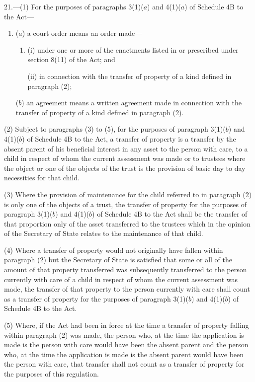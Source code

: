\documentclass[a4paper]{article}
\newcommand{\parthead}{}
\begin{document}
\renewcommand\parthead{--- Part IV}

21.—(1) For the purposes of paragraphs 3(1)($a$) and 4(1)($a$) of Schedule 4B to the Act—
\begin{enumerate}\item[]
($a$) a court order means an order made—
\begin{enumerate}\item[]
(i) under one or more of the enactments listed in or prescribed under section 8(11) of the Act; and

(ii) in connection with the transfer of property of a kind defined in paragraph (2);
\end{enumerate}

($b$) an agreement means a written agreement made in connection with the transfer of property of a kind defined in paragraph (2).
\end{enumerate}

(2) Subject to paragraphs (3) to (5), for the purposes of paragraph 3(1)($b$) and 4(1)($b$) of Schedule 4B to the Act, a transfer of property is a transfer by the absent parent of his beneficial interest in any asset to the person with care, to a child in respect of whom the current assessment was made or to trustees where the object or one of the objects of the trust is the provision of basic day to day necessities for that child.

(3) Where the provision of maintenance for the child referred to in paragraph (2) is only one of the objects of a trust, the transfer of property for the purposes of paragraph 3(1)($b$) and 4(1)($b$) of Schedule 4B to the Act shall be the transfer of that proportion only of the asset transferred to the trustees which in the opinion of the Secretary of State relates to the maintenance of that child.

(4) Where a transfer of property would not originally have fallen within paragraph (2) but the Secretary of State is satisfied that some or all of the amount of that property transferred was subsequently transferred to the person currently with care of a child in respect of whom the current assessment was made, the transfer of that property to the person currently with care shall count as a transfer of property for the purposes of paragraph 3(1)($b$) and 4(1)($b$) of Schedule 4B to the Act.

(5) Where, if the Act had been in force at the time a transfer of property falling within paragraph (2) was made, the person who, at the time the application is made is the person with care would have been the absent parent and the person who, at the time the application is made is the absent parent would have been the person with care, that transfer shall not count as a transfer of property for the purposes of this regulation.
\end{document}
